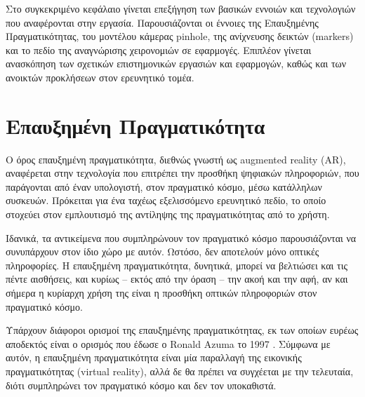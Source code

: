 

 \label{c:complex}

Στο συγκεκριμένο κεφάλαιο γίνεται επεξήγηση των βασικών εννοιών και τεχνολογιών που αναφέρονται στην εργασία. Παρουσιάζονται οι έννοιες της Επαυξημένης Πραγματικότητας, του μοντέλου κάμερας pinhole, της ανίχνευσης δεικτών (markers) και το πεδίο της αναγνώρισης χειρονομιών σε εφαρμογές. Επιπλέον γίνεται ανασκόπηση των σχετικών επιστημονικών εργασιών και εφαρμογών, καθώς και των ανοικτών προκλήσεων στον ερευνητικό τομέα.



\section{Επαυξημένη Πραγματικότητα}


Ο όρος επαυξημένη πραγματικότητα, διεθνώς γνωστή ως augmented reality (AR), αναφέρεται στην τεχνολογία που επιτρέπει την προσθήκη ψηφιακών πληροφοριών, που παράγονται από έναν υπολογιστή, στον πραγματικό κόσμο, μέσω κατάλληλων συσκευών. Πρόκειται για ένα ταχέως εξελισσόμενο ερευνητικό πεδίο, το οποίο στοχεύει στον εμπλουτισμό της αντίληψης της πραγματικότητας από το χρήστη.


Ιδανικά, τα αντικείμενα που συμπληρώνουν τον πραγματικό κόσμο παρουσιάζονται να συνυπάρχουν στον ίδιο χώρο με αυτόν. Ωστόσο, δεν αποτελούν μόνο οπτικές πληροφορίες. Η επαυξημένη πραγματικότητα, δυνητικά, μπορεί να βελτιώσει και τις πέντε αισθήσεις, και κυρίως – εκτός από την όραση – την ακοή και την αφή, αν και σήμερα η κυρίαρχη χρήση της είναι η προσθήκη οπτικών πληροφοριών στον πραγματικό κόσμο. 


Υπάρχουν διάφοροι ορισμοί της επαυξημένης πραγματικότητας, εκ των οποίων ευρέως αποδεκτός είναι ο ορισμός που έδωσε ο Ronald Azuma το 1997 \cite{azuma1997}. Σύμφωνα με αυτόν, η επαυξημένη πραγματικότητα είναι μία παραλλαγή της εικονικής πραγματικότητας (virtual reality), αλλά δε θα πρέπει να συγχέεται με την τελευταία, διότι συμπληρώνει τον πραγματικό κόσμο και δεν τον υποκαθιστά. 




